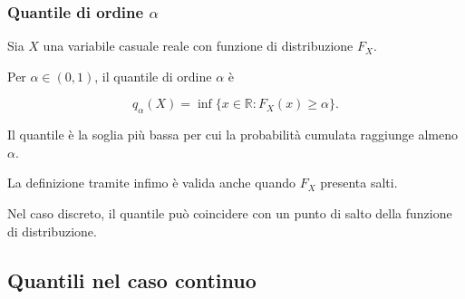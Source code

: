 \documentclass[handout]{beamer}%
\providecommand{\1}{\mathbf{1}}
\providecommand{\QTR}[2]{\csname #1\endcsname{#2}}
\begin{document}
\begin{frame}%
%

\frametitle{Quantile di ordine $\alpha$}%


Sia $X$ una variabile casuale reale con funzione di distribuzione $F_{X}$.

\medskip

Per $\alpha\in(0,1)$, il quantile di ordine $\alpha$ \`{e}%

\[
q_{\alpha}(X) = \inf\{x\in\mathbb{R}:F_{X}(x)\geq\alpha\}.
\]


\medskip

Il quantile \`{e} la soglia pi\`{u} bassa per cui la probabilit\`{a} cumulata
raggiunge almeno $\alpha$.

\medskip

La definizione tramite infimo \`{e} valida anche quando $F_{X}$ presenta salti.

\medskip

Nel caso discreto, il quantile pu\`{o} coincidere con un punto di salto della
funzione di distribuzione.%

\transboxout
\end{frame}%




\subsection{Quantili nel caso continuo}%
\end{document}
